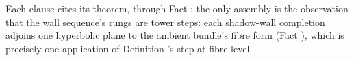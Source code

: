 Each clause cites its theorem, through Fact ; the only assembly is the observation that the wall sequence's rungs are tower steps: each shadow-wall completion adjoins one hyperbolic plane to the ambient bundle's fibre form (Fact ), which is precisely one application of Definition 's step at fibre level.
